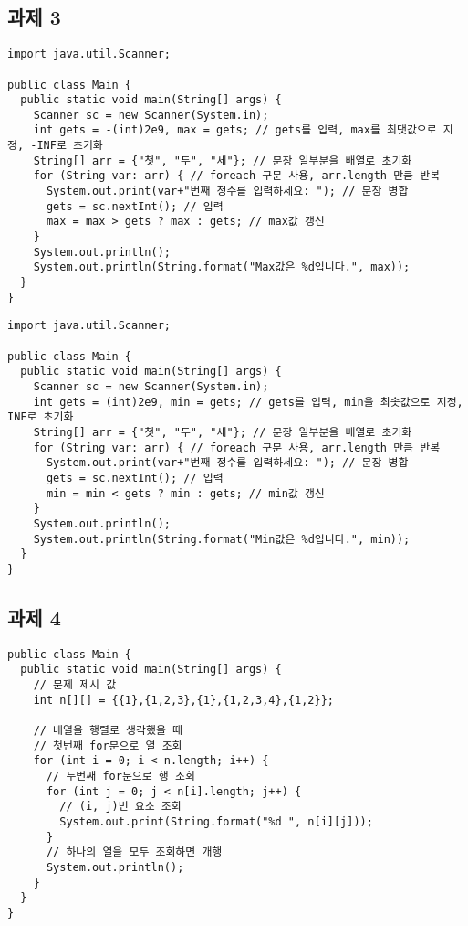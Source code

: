 \documentclass{article}
\begin{document}
\subsection{과제 3}
\begin{lstlisting}
import java.util.Scanner;

public class Main {
  public static void main(String[] args) {
    Scanner sc = new Scanner(System.in);
    int gets = -(int)2e9, max = gets; // gets를 입력, max를 최댓값으로 지정, -INF로 초기화
    String[] arr = {"첫", "두", "세"}; // 문장 일부분을 배열로 초기화
    for (String var: arr) { // foreach 구문 사용, arr.length 만큼 반복
      System.out.print(var+"번째 정수를 입력하세요: "); // 문장 병합
      gets = sc.nextInt(); // 입력
      max = max > gets ? max : gets; // max값 갱신
    }
    System.out.println();
    System.out.println(String.format("Max값은 %d입니다.", max));
  }
}
\end{lstlisting}
\begin{lstlisting}
import java.util.Scanner;

public class Main {
  public static void main(String[] args) {
    Scanner sc = new Scanner(System.in);
    int gets = (int)2e9, min = gets; // gets를 입력, min을 최솟값으로 지정, INF로 초기화
    String[] arr = {"첫", "두", "세"}; // 문장 일부분을 배열로 초기화
    for (String var: arr) { // foreach 구문 사용, arr.length 만큼 반복
      System.out.print(var+"번째 정수를 입력하세요: "); // 문장 병합
      gets = sc.nextInt(); // 입력
      min = min < gets ? min : gets; // min값 갱신
    }
    System.out.println();
    System.out.println(String.format("Min값은 %d입니다.", min));
  }
}
\end{lstlisting}
\subsection{과제 4}
\begin{lstlisting}
public class Main {
  public static void main(String[] args) {
    // 문제 제시 값
    int n[][] = {{1},{1,2,3},{1},{1,2,3,4},{1,2}};

    // 배열을 행렬로 생각했을 때
    // 첫번째 for문으로 열 조회
    for (int i = 0; i < n.length; i++) {
      // 두번째 for문으로 행 조회
      for (int j = 0; j < n[i].length; j++) {
        // (i, j)번 요소 조회
        System.out.print(String.format("%d ", n[i][j]));
      }
      // 하나의 열을 모두 조회하면 개행
      System.out.println();
    }
  }
}
\end{lstlisting}
\end{document}
